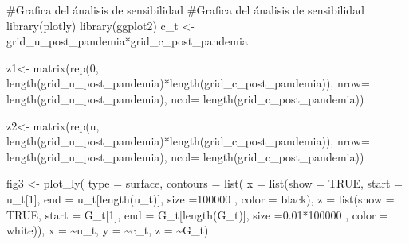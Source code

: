 \documentclass[
  us-letterpaper,
]{scrreprt}
\newenvironment{Shaded}{\begin{snugshade}}{\end{snugshade}}
\newcommand{\AttributeTok}[1]{\textcolor[rgb]{0.40,0.45,0.13}{#1}}
\newcommand{\CommentTok}[1]{\textcolor[rgb]{0.37,0.37,0.37}{#1}}
\newcommand{\ConstantTok}[1]{\textcolor[rgb]{0.56,0.35,0.01}{#1}}
\newcommand{\DecValTok}[1]{\textcolor[rgb]{0.68,0.00,0.00}{#1}}
\newcommand{\FloatTok}[1]{\textcolor[rgb]{0.68,0.00,0.00}{#1}}
\newcommand{\FunctionTok}[1]{\textcolor[rgb]{0.28,0.35,0.67}{#1}}
\newcommand{\NormalTok}[1]{\textcolor[rgb]{0.00,0.23,0.31}{#1}}
\newcommand{\OtherTok}[1]{\textcolor[rgb]{0.00,0.23,0.31}{#1}}
\newcommand{\SpecialCharTok}[1]{\textcolor[rgb]{0.37,0.37,0.37}{#1}}
\newcommand{\StringTok}[1]{\textcolor[rgb]{0.13,0.47,0.30}{#1}}
\theoremstyle{definition}
\theoremstyle{plain}
\theoremstyle{plain}
\theoremstyle{remark}
\begin{document}
\begin{Shaded}
\begin{Highlighting}[]
\CommentTok{\#Grafica del ánalisis de sensibilidad}
\CommentTok{\#Grafica del ánalisis de sensibilidad}
\FunctionTok{library}\NormalTok{(plotly)}
\FunctionTok{library}\NormalTok{(ggplot2)}
\NormalTok{c\_t }\OtherTok{\textless{}{-}}\NormalTok{ grid\_u\_post\_pandemia}\SpecialCharTok{*}\NormalTok{grid\_c\_post\_pandemia}

\NormalTok{z1}\OtherTok{\textless{}{-}} \FunctionTok{matrix}\NormalTok{(}\FunctionTok{rep}\NormalTok{(}\DecValTok{0}\NormalTok{,}
\FunctionTok{length}\NormalTok{(grid\_u\_post\_pandemia)}\SpecialCharTok{*}\FunctionTok{length}\NormalTok{(grid\_c\_post\_pandemia)), }\AttributeTok{nrow=}
\FunctionTok{length}\NormalTok{(grid\_u\_post\_pandemia), }\AttributeTok{ncol=} \FunctionTok{length}\NormalTok{(grid\_c\_post\_pandemia))}

\NormalTok{z2}\OtherTok{\textless{}{-}} \FunctionTok{matrix}\NormalTok{(}\FunctionTok{rep}\NormalTok{(u,}
\FunctionTok{length}\NormalTok{(grid\_u\_post\_pandemia)}\SpecialCharTok{*}\FunctionTok{length}\NormalTok{(grid\_c\_post\_pandemia)), }\AttributeTok{nrow=}
\FunctionTok{length}\NormalTok{(grid\_u\_post\_pandemia), }\AttributeTok{ncol=} \FunctionTok{length}\NormalTok{(grid\_c\_post\_pandemia))}

\NormalTok{fig3 }\OtherTok{\textless{}{-}} \FunctionTok{plot\_ly}\NormalTok{(}
  \AttributeTok{type =} \StringTok{\textquotesingle{}surface\textquotesingle{}}\NormalTok{,}
  \AttributeTok{contours =} \FunctionTok{list}\NormalTok{(}
    \AttributeTok{x =} \FunctionTok{list}\NormalTok{(}\AttributeTok{show =} \ConstantTok{TRUE}\NormalTok{, }\AttributeTok{start =}\NormalTok{ u\_t[}\DecValTok{1}\NormalTok{], }\AttributeTok{end =}
\NormalTok{u\_t[}\FunctionTok{length}\NormalTok{(u\_t)], }\AttributeTok{size =}\DecValTok{100000}\NormalTok{ ,}
\AttributeTok{color =} \StringTok{\textquotesingle{}black\textquotesingle{}}\NormalTok{),}
    \AttributeTok{z =} \FunctionTok{list}\NormalTok{(}\AttributeTok{show =} \ConstantTok{TRUE}\NormalTok{, }\AttributeTok{start =}\NormalTok{ G\_t[}\DecValTok{1}\NormalTok{], }
             \AttributeTok{end =}\NormalTok{ G\_t[}\FunctionTok{length}\NormalTok{(G\_t)], }\AttributeTok{size =}\FloatTok{0.01}\SpecialCharTok{*}\DecValTok{100000}\NormalTok{ , }
             \AttributeTok{color =} \StringTok{\textquotesingle{}white\textquotesingle{}}\NormalTok{)),}
  \AttributeTok{x =} \SpecialCharTok{\textasciitilde{}}\NormalTok{u\_t,}
  \AttributeTok{y =} \SpecialCharTok{\textasciitilde{}}\NormalTok{c\_t,}
  \AttributeTok{z =} \SpecialCharTok{\textasciitilde{}}\NormalTok{G\_t)}


\end{Highlighting}
\end{Shaded}
\end{document}

